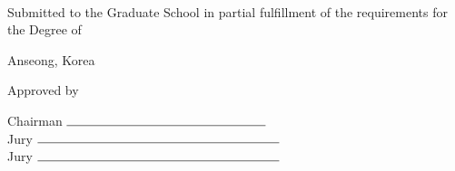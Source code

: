 \begin{center}
  ~\vspace{1cm}
  
  \fontsize{16pt}{0cm}\selectfont
  \textbf{\mytitle} \vspace{1.5cm}
  
  \myname \vspace{1cm}
  
  \fontsize{14pt}{0.5cm}\selectfont
  Submitted to the Graduate School in partial fulfillment of the requirements for the Degree of 
  \vspace{1.5cm}
  
  Anseong, Korea\\
  \submitdate \vspace{1.5cm}
  
  Approved by \vspace{1cm}
  
  \fontsize{15pt}{1.2cm}\selectfont
  {\color[gray]{1}{~(signature)}}Chairman $\rule{5.5cm}{0.15mm}${\color[gray]{0.8}{~(signature)}}\\
  {\color[gray]{1}{~(signature)}}Jury $\rule{6.7cm}{0.15mm}${\color[gray]{0.8}{~(signature)}}\\
  {\color[gray]{1}{~(signature)}}Jury $\rule{6.7cm}{0.15mm}${\color[gray]{0.8}{~(signature)}}\\
\end{center}
\thispagestyle{empty}
